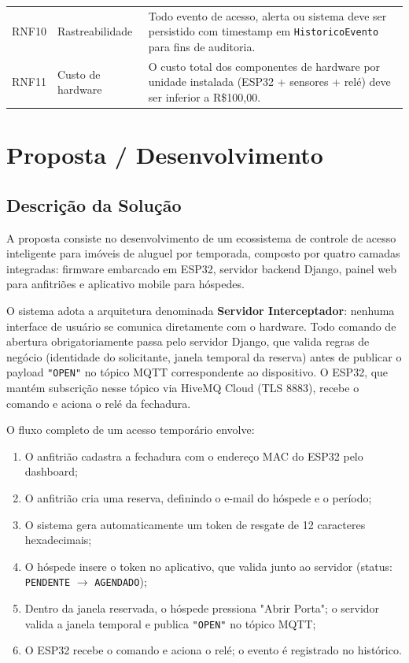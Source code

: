 \documentclass[12pt,a4paper]{article}
\begin{document}
\begin{longtable}{p{1.100cm} p{3.800cm} p{10.00cm}}
  RNF10 & Rastreabilidade & Todo evento de acesso, alerta ou sistema deve ser
          persistido com timestamp em \texttt{HistoricoEvento} para fins de auditoria. \\[3pt]

  RNF11 & Custo de hardware & O custo total dos componentes de hardware por unidade
          instalada (ESP32 + sensores + relé) deve ser inferior a R\$100,00. \\[3pt]
\end{longtable}

\section{Proposta / Desenvolvimento}

\subsection{Descrição da Solução}

A proposta consiste no desenvolvimento de um ecossistema de controle de acesso
inteligente para imóveis de aluguel por temporada, composto por quatro camadas
integradas: firmware embarcado em ESP32, servidor backend Django, painel web
para anfitriões e aplicativo mobile para hóspedes.

O sistema adota a arquitetura denominada \textbf{Servidor Interceptador}: nenhuma
interface de usuário se comunica diretamente com o hardware. Todo comando de abertura
obrigatoriamente passa pelo servidor Django, que valida regras de negócio (identidade
do solicitante, janela temporal da reserva) antes de publicar o payload \texttt{"OPEN"}
no tópico MQTT correspondente ao dispositivo. O ESP32, que mantém subscrição nesse
tópico via HiveMQ Cloud (TLS 8883), recebe o comando e aciona o relé da fechadura.

O fluxo completo de um acesso temporário envolve:
\begin{enumerate}
  \item O anfitrião cadastra a fechadura com o endereço MAC do ESP32 pelo dashboard;
  \item O anfitrião cria uma reserva, definindo o e-mail do hóspede e o período;
  \item O sistema gera automaticamente um token de resgate de 12 caracteres hexadecimais;
  \item O hóspede insere o token no aplicativo, que valida junto ao servidor
        (status: \texttt{PENDENTE} $\to$ \texttt{AGENDADO});
  \item Dentro da janela reservada, o hóspede pressiona "Abrir Porta"; o servidor
        valida a janela temporal e publica \texttt{"OPEN"} no tópico MQTT;
  \item O ESP32 recebe o comando e aciona o relé; o evento é registrado no histórico.
\end{enumerate}
\end{document}
